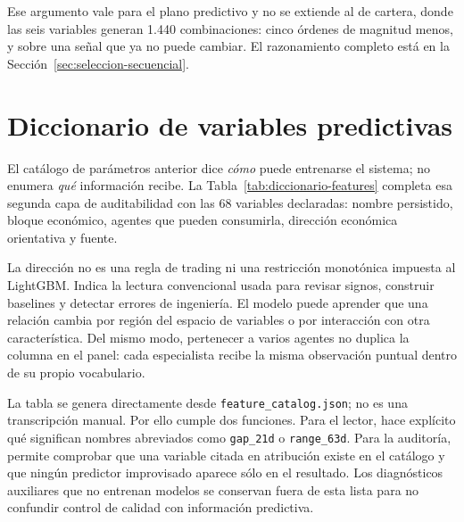 Ese argumento vale para el plano predictivo y no se extiende al de cartera, donde las seis variables
generan 1.440 combinaciones: cinco órdenes de magnitud menos, y sobre una señal que ya no puede
cambiar. El razonamiento completo está en la Sección~\ref{sec:seleccion-secuencial}.

\section{Diccionario de variables predictivas}
\label{sec:diccionario-features}

El catálogo de parámetros anterior dice \emph{cómo} puede entrenarse el sistema; no enumera
\emph{qué} información recibe. La Tabla~\ref{tab:diccionario-features} completa esa segunda capa de
auditabilidad con las 68 variables declaradas: nombre persistido, bloque económico, agentes que
pueden consumirla, dirección económica orientativa y fuente.

La dirección no es una regla de trading ni una restricción monotónica impuesta al LightGBM. Indica
la lectura convencional usada para revisar signos, construir baselines y detectar errores de
ingeniería. El modelo puede aprender que una relación cambia por región del espacio de variables o
por interacción con otra característica. Del mismo modo, pertenecer a varios agentes no duplica la
columna en el panel: cada especialista recibe la misma observación puntual dentro de su propio
vocabulario.

\begin{landscape}
\footnotesize

\end{landscape}

La tabla se genera directamente desde \texttt{feature\_catalog.json}; no es una transcripción
manual. Por ello cumple dos funciones. Para el lector, hace explícito qué significan nombres
abreviados como \texttt{gap\_21d} o \texttt{range\_63d}. Para la auditoría, permite comprobar que
una variable citada en atribución existe en el catálogo y que ningún predictor improvisado aparece
sólo en el resultado. Los diagnósticos auxiliares que no entrenan modelos se conservan fuera de
esta lista para no confundir control de calidad con información predictiva.
